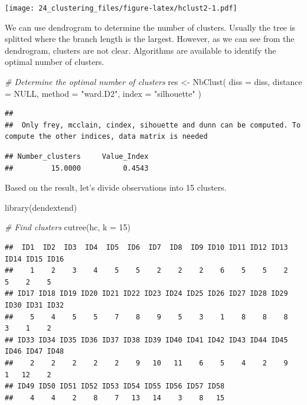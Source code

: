 \documentclass[
]{book}
\newenvironment{Shaded}{\begin{snugshade}}{\end{snugshade}}
\newcommand{\AttributeTok}[1]{\textcolor[rgb]{0.77,0.63,0.00}{#1}}
\newcommand{\CommentTok}[1]{\textcolor[rgb]{0.56,0.35,0.01}{\textit{#1}}}
\newcommand{\ConstantTok}[1]{\textcolor[rgb]{0.00,0.00,0.00}{#1}}
\newcommand{\DecValTok}[1]{\textcolor[rgb]{0.00,0.00,0.81}{#1}}
\newcommand{\FunctionTok}[1]{\textcolor[rgb]{0.00,0.00,0.00}{#1}}
\newcommand{\NormalTok}[1]{#1}
\newcommand{\OtherTok}[1]{\textcolor[rgb]{0.56,0.35,0.01}{#1}}
\newcommand{\SpecialCharTok}[1]{\textcolor[rgb]{0.00,0.00,0.00}{#1}}
\newcommand{\StringTok}[1]{\textcolor[rgb]{0.31,0.60,0.02}{#1}}
\begin{document}
\texttt{[image: 24\_clustering\_files/figure-latex/hclust2-1.pdf]}

We can use dendrogram to determine the number of clusters. Usually the
tree is splitted where the branch length is the largest. However, as
we can see from the dendrogram, clusters are not clear. Algorithms are
available to identify the optimal number of clusters.

\begin{Shaded}
\begin{Highlighting}[]
\CommentTok{\# Determine the optimal number of clusters}
\NormalTok{res }\OtherTok{\textless{}{-}} \FunctionTok{NbClust}\NormalTok{(}
  \AttributeTok{diss =}\NormalTok{ diss, }\AttributeTok{distance =} \ConstantTok{NULL}\NormalTok{, }\AttributeTok{method =} \StringTok{"ward.D2"}\NormalTok{,}
  \AttributeTok{index =} \StringTok{"silhouette"}
\NormalTok{)}
\end{Highlighting}
\end{Shaded}

\begin{verbatim}
## 
##  Only frey, mcclain, cindex, sihouette and dunn can be computed. To compute the other indices, data matrix is needed
\end{verbatim}

\begin{Shaded}
\end{Shaded}

\begin{verbatim}
## Number_clusters     Value_Index 
##         15.0000          0.4543
\end{verbatim}

Based on the result, let's divide observations into 15 clusters.

\begin{Shaded}
\begin{Highlighting}[]
\FunctionTok{library}\NormalTok{(dendextend)}

\CommentTok{\# Find clusters}
\FunctionTok{cutree}\NormalTok{(hc, }\AttributeTok{k =} \DecValTok{15}\NormalTok{)}
\end{Highlighting}
\end{Shaded}

\begin{verbatim}
##  ID1  ID2  ID3  ID4  ID5  ID6  ID7  ID8  ID9 ID10 ID11 ID12 ID13 ID14 ID15 ID16 
##    1    2    3    4    5    5    2    2    2    6    5    5    2    5    2    5 
## ID17 ID18 ID19 ID20 ID21 ID22 ID23 ID24 ID25 ID26 ID27 ID28 ID29 ID30 ID31 ID32 
##    5    4    5    5    7    8    9    5    3    1    8    8    8    3    1    2 
## ID33 ID34 ID35 ID36 ID37 ID38 ID39 ID40 ID41 ID42 ID43 ID44 ID45 ID46 ID47 ID48 
##    2    2    2    2    2    9   10   11    6    5    4    2    9    1   12    2 
## ID49 ID50 ID51 ID52 ID53 ID54 ID55 ID56 ID57 ID58 
##    4    4    2    8    7   13   14    3    8   15
\end{verbatim}
\end{document}
